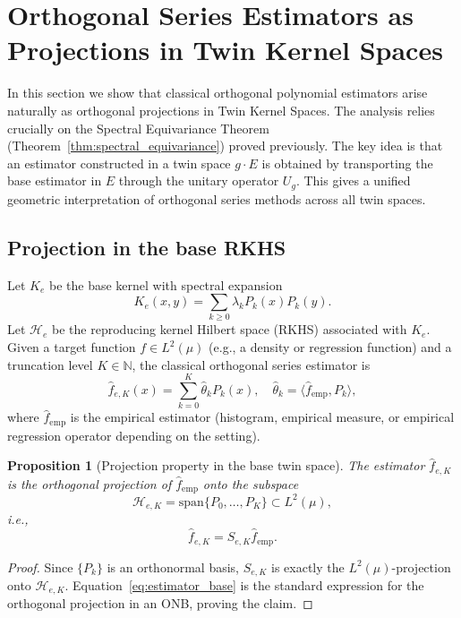 \documentclass[11pt,a4paper]{article}
\newtheorem{proposition}[theorem]{Proposition}
\newcommand{\N}{\mathbb{N}}
\newcommand{\RKHS}{\mathcal{H}}
\newcommand{\ip}[2]{\langle #1, #2 \rangle}
\begin{document}
\section{Orthogonal Series Estimators as Projections in Twin Kernel Spaces}\label{sec:projection}

In this section we show that classical orthogonal polynomial estimators arise naturally as orthogonal projections in Twin Kernel Spaces. The analysis relies crucially on the Spectral Equivariance Theorem (Theorem~\ref{thm:spectral_equivariance}) proved previously. The key idea is that an estimator constructed in a twin space $g \cdot E$ is obtained by transporting the base estimator in $E$ through the unitary operator $U_g$. This gives a unified geometric interpretation of orthogonal series methods across all twin spaces.

\subsection{Projection in the base RKHS}

Let $K_e$ be the base kernel with spectral expansion
\[
K_e(x, y) = \sum_{k \geq 0} \lambda_k P_k(x) P_k(y).
\]
Let $\RKHS_e$ be the reproducing kernel Hilbert space (RKHS) associated with $K_e$. Given a target function $f \in L^2(\mu)$ (e.g., a density or regression function) and a truncation level $K \in \N$, the classical orthogonal series estimator is
\begin{equation}\label{eq:estimator_base}
\hat{f}_{e,K}(x) = \sum_{k=0}^{K} \hat{\theta}_k P_k(x), \quad \hat{\theta}_k = \ip{\hat{f}_{\mathrm{emp}}}{P_k},
\end{equation}
where $\hat{f}_{\mathrm{emp}}$ is the empirical estimator (histogram, empirical measure, or empirical regression operator depending on the setting).

\begin{proposition}[Projection property in the base twin space]\label{prop:projection_base}
The estimator $\hat{f}_{e,K}$ is the orthogonal projection of $\hat{f}_{\mathrm{emp}}$ onto the subspace
\[
\RKHS_{e,K} = \mathrm{span}\{P_0, \ldots, P_K\} \subset L^2(\mu),
\]
i.e.,
\[
\hat{f}_{e,K} = S_{e,K} \hat{f}_{\mathrm{emp}}.
\]
\end{proposition}

\begin{proof}
Since $\{P_k\}$ is an orthonormal basis, $S_{e,K}$ is exactly the $L^2(\mu)$-projection onto $\RKHS_{e,K}$. Equation~\eqref{eq:estimator_base} is the standard expression for the orthogonal projection in an ONB, proving the claim.
\end{proof}
\end{document}
